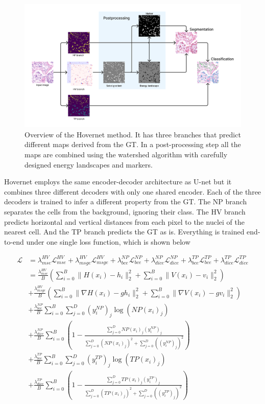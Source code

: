 \begin{figure}[ht]
    \centering
    \includegraphics[width=\textwidth]{imgs/hovpipe.png}
    \caption{Overview of the Hovernet method. It has three branches that predict different maps derived from the GT. In a post-processing step all the maps are combined using the watershed algorithm with carefully designed energy landscapes and markers.}
    \label{fig:hovpipe}
\end{figure}

Hovernet employs the same encoder-decoder architecture as U-net but it combines three different decoders with only one shared encoder. Each of the three decoders is trained to infer a different property from the GT. The NP branch separates the cells from the background, ignoring their class. The HV branch predicts horizontal and vertical distances from each pixel to the nuclei of the nearest cell. And the TP branch predicts the GT as is. Everything is trained end-to-end under one single loss function, which is shown below

\begin{align}
    \mathcal{L} &= \lambda_{mse}^{HV}\mathcal{L}_{mse}^{HV} + \lambda_{msge}^{HV}\mathcal{L}_{msge}^{HV} + \lambda_{bce}^{NP}\mathcal{L}_{bce}^{NP} + \lambda_{dice}^{NP}\mathcal{L}_{dice}^{NP} + \lambda_{bce}^{TP}\mathcal{L}_{bce}^{TP} + \lambda_{dice}^{TP}\mathcal{L}_{dice}^{TP} \\
    &= \frac{\lambda_{mse}^{HV}}{B}\left( \sum_{i=0}^{B} \| H(x_i) - h_i \|_2^2 + \sum_{i=0}^{B} \| V(x_i) - v_i \|_2^2 \right) \\
    &+ \frac{\lambda_{msge}^{HV}}{B}\left( \sum_{i=0}^{B} \| \nabla H(x_i) - gh_i \|_2^2 + \sum_{i=0}^{B} \| \nabla V(x_i) - gv_i \|_2^2 \right) \\
    &+ \frac{\lambda_{bce}^{NP}}{B} \sum_{i=0}^B \sum_{j=0}^{D} (y_{i}^{NP})_j \log (NP(x_i)_j) \\
    &+ \frac{\lambda_{dice}^{NP}}{B} \sum_{i=0}^B \left(1 - \frac{\sum_{j=0}^D NP(x_i)_j (y_{i}^{NP})_j}{\sum_{j=0}^D (NP(x_i)_j)^2 + \sum_{j=0}^D ((y_{i}^{NP})_j)^2}\right)\\
    &+ \frac{\lambda_{bce}^{TP}}{B} \sum_{i=0}^B \sum_{j=0}^{D} (y_{i}^{TP})_j \log (TP(x_i)_j) \\
    &+ \frac{\lambda_{dice}^{TP}}{B} \sum_{i=0}^B \left(1 - \frac{\sum_{j=0}^D TP(x_i)_j (y_{i}^{TP})_j}{\sum_{j=0}^D (TP(x_i)_j)^2 + \sum_{j=0}^D ((y_{i}^{TP})_j)^2}\right)
\end{align}

